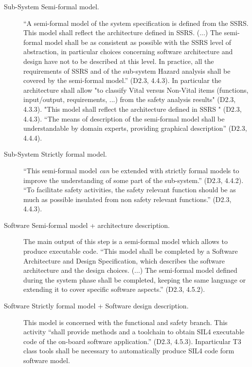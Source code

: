 \begin{description}
  \item [Sub-System Semi-formal model.]  ``A semi-formal model of the system specification is defined from the SSRS. This model shall reflect the architecture defined in SSRS. (...) The semi-formal model shall be as consistent as possible with the SSRS level of abstraction, in particular choices concerning
software architecture and design have not to be described at this level. In practice, all the requirements of SSRS and of the sub-system Hazard analysis shall be covered by the semi-formal model.'' (D2.3, 4.4.3). In particular the architecture shall allow "to classify Vital versus Non-Vital items (functions, input/output, requirements, ...) from the
safety analysis results" (D2.3, 4.3.3). "This model shall reflect the
architecture defined in SSRS " (D2.3, 4.4.3).
 ``The means of description of the semi-formal model shall be understandable by domain experts, providing graphical description'' (D2.3, 4.4.4).

  \item [Sub-System Strictly formal model.] ``This semi-formal model \emph{can} be extended with strictly formal models to improve the understanding of some part of the sub-system.'' (D2.3, 4.4.2).  ``To facilitate safety activities, the safety relevant function should be as much as possible insulated from non safety relevant functions.'' (D2.3, 4.4.3).

  \item [Software Semi-formal model + architecture description.] The main output of this step is a semi-formal model which allows to produce executable code. ``This model shall be completed by a Software Architecture and Design Specification, which describes the software architecture and the design choices. (...) The semi-formal model defined during the system phase shall be completed, keeping the same language or extending it to cover specific software aspects.'' (D2.3, 4.5.2).

  \item [Software Strictly formal model + Software design description.]  This model is concerned with the functional and safety branch.  This activity ``shall provide methods and a toolchain to obtain SIL4 executable code of the on-board software application.'' (D2.3, 4.5.3). Inparticular T3 class tools shall be necessary  to  automatically produce SIL4 code form software model.

\end{description}


